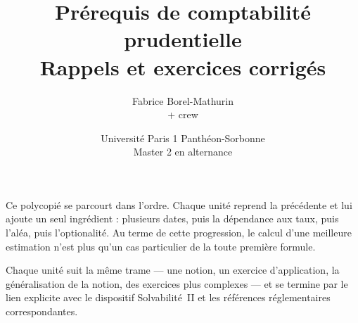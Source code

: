 \documentclass[11pt,a4paper]{article}
\title{\vspace{-1.5cm}\sffamily\bfseries\color{bleuactu}
       Prérequis de comptabilité prudentielle\\[2mm]
       \large\mdseries\color{black}Rappels et exercices corrigés}
\author{\sffamily Fabrice Borel-Mathurin \\+ crew}
\date{\sffamily\small Université Paris 1 Panthéon-Sorbonne \\ Master 2 en alternance}
\begin{document}
\maketitle
\thispagestyle{empty}

\begin{center}
\begin{minipage}{0.86\textwidth}
\small
Ce polycopié se parcourt dans l'ordre. Chaque unité reprend la précédente et lui
ajoute un seul ingrédient : plusieurs dates, puis la dépendance aux taux, puis
l'aléa, puis l'optionalité. Au terme de cette progression, le calcul d'une
meilleure estimation n'est plus qu'un cas particulier de la toute première
formule.

\medskip
Chaque unité suit la même trame --- une notion, un exercice d'application, la
généralisation de la notion, des exercices plus complexes --- et se termine par
le lien explicite avec le dispositif Solvabilité~II et les références
réglementaires correspondantes.
\end{minipage}
\end{center}

\vspace{6mm}
\tableofcontents
\newpage


\newpage

\newpage

\newpage

\newpage

\newpage

\end{document}
